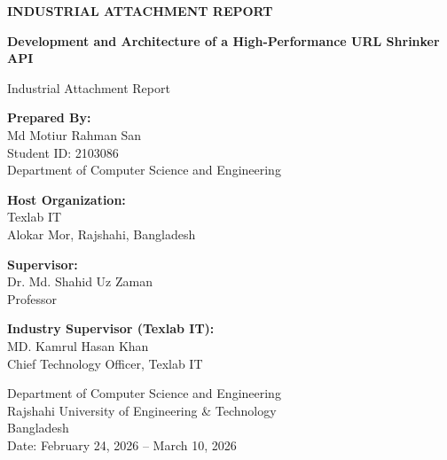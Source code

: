 \begin{titlepage}
    \begin{center}
        \vspace*{1cm}
        
        \Huge
        \textbf{INDUSTRIAL ATTACHMENT REPORT}
        
        \vspace{1.5cm}
        
        \Large
        \textbf{Development and Architecture of a High-Performance URL Shrinker API}
        
        \vspace{0.8cm}
        \large
        Industrial Attachment Report 
        
        \vspace{1.5cm}
        
        \textbf{Prepared By:} \\
        Md Motiur Rahman San \\
        Student ID: 2103086 \\
        Department of Computer Science and Engineering
        
        \vspace{1.5cm}
        
        \textbf{Host Organization:} \\
        Texlab IT \\
        Alokar Mor, Rajshahi, Bangladesh \\
        
        \vspace{1.5cm}
        
        \textbf{Supervisor:} \\
        Dr. Md. Shahid Uz Zaman \\
        Professor
        
        \vspace{0.5cm}
        
        \textbf{Industry Supervisor (Texlab IT):} \\
        MD. Kamrul Hasan Khan \\
        Chief Technology Officer, Texlab IT \\
        
        \vfill
        
        \vspace{0.8cm}
        
        \Large
        Department of Computer Science and Engineering \\
        Rajshahi University of Engineering & Technology \\
        Bangladesh \\
        \vspace{0.5cm}
        Date: February 24, 2026 -- March 10, 2026
        
    \end{center}
\end{titlepage}
